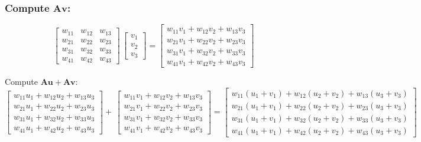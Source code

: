 \documentclass[12pt]{article}
\newcommand{\vsp}{\vspace*{1em}}
\begin{document}
\vsp

\subsubsection*{\noindent Compute $\mathbf{A} \mathbf{v}$:}

\[
    \begin{bmatrix}
        w_{11} & w_{12} & w_{13} \\
        w_{21} & w_{22} & w_{23} \\
        w_{31} & w_{32} & w_{33} \\
        w_{41} & w_{42} & w_{43}
    \end{bmatrix}
    \,
    \begin{bmatrix}
        v_1 \\
        v_2 \\
        v_3
    \end{bmatrix}
    =
    \begin{bmatrix}
        w_{11} v_1  + w_{12} v_2 + w_{13} v_3 \\
        w_{21} v_1  + w_{22} v_2 + w_{23} v_3 \\
        w_{31} v_1  + w_{32} v_2 + w_{33} v_3 \\
        w_{41} v_1  + w_{42} v_2 + w_{43} v_3
    \end{bmatrix}
\]


\vsp

\noindent Compute $\mathbf{A} \mathbf{u} + \mathbf{A} \mathbf{v}$:
\[
    \begin{bmatrix}
        w_{11} u_1  + w_{12} u_2 + w_{13} u_3 \\
        w_{21} u_1  + w_{22} u_2 + w_{23} u_3 \\
        w_{31} u_1  + w_{32} u_2 + w_{33} u_3 \\
        w_{41} u_1  + w_{42} u_2 + w_{43} u_3
    \end{bmatrix}
    + \,
    \begin{bmatrix}
        w_{11} v_1  + w_{12} v_2 + w_{13} v_3 \\
        w_{21} v_1  + w_{22} v_2 + w_{23} v_3 \\
        w_{31} v_1  + w_{32} v_2 + w_{33} v_3 \\
        w_{41} v_1  + w_{42} v_2 + w_{43} v_3
    \end{bmatrix}
    =
    \begin{bmatrix}
        w_{11} (u_1 + v_1)  + w_{12} (u_2 + v_2) + w_{13} (u_3 + v_3) \\
        w_{21} (u_1 + v_1)  + w_{22} (u_2 + v_2) + w_{23} (u_3 + v_3) \\
        w_{31} (u_1 + v_1)  + w_{32} (u_2 + v_2) + w_{33} (u_3 + v_3) \\
        w_{41} (u_1 + v_1)  + w_{42} (u_2 + v_2) + w_{43} (u_3 + v_3)
    \end{bmatrix}
\]
\end{document}
